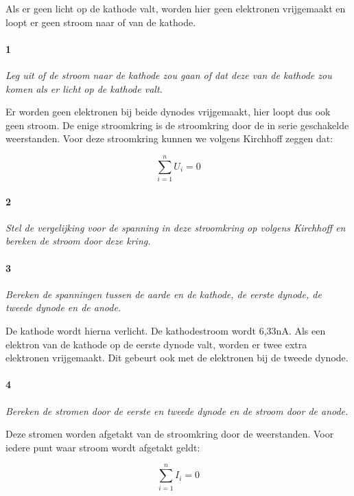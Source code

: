 Als er geen licht op de kathode valt, worden hier geen elektronen
vrijgemaakt en loopt er geen stroom naar of van de kathode. 


\paragraph{1 }

\textit{Leg uit of de stroom naar de kathode zou gaan of dat deze
van de kathode zou komen als er licht op de kathode valt.}

Er worden geen elektronen bij beide dynodes vrijgemaakt, hier loopt
dus ook geen stroom. De enige stroomkring is de stroomkring door de
in serie geschakelde weerstanden. Voor deze stroomkring kunnen we 
volgens Kirchhoff zeggen dat: 

\begin{equation}
    \sum_{i=1}^n U_{i} = 0
\end{equation}

\paragraph{2}

\textit{Stel de vergelijking voor de spanning in deze stroomkring
op volgens Kirchhoff en bereken de stroom door deze kring.}


\paragraph{3}

\textit{Bereken de spanningen tussen de aarde en de kathode, de eerste
dynode, de tweede dynode en de anode.}

De kathode wordt hierna verlicht. De kathodestroom wordt 6,33nA.
Als een elektron van de kathode op de eerste dynode valt, worden er
twee extra elektronen vrijgemaakt. Dit gebeurt ook met de elektronen
bij de tweede dynode.


\paragraph{4}

\textit{Bereken de stromen door de eerste en tweede dynode en de stroom
door de anode.}

Deze stromen worden afgetakt van de stroomkring door de weerstanden. 
Voor iedere punt waar stroom wordt afgetakt geldt:

\begin{equation}
    \sum_{i=1}^n I_{i} = 0
\end{equation}

